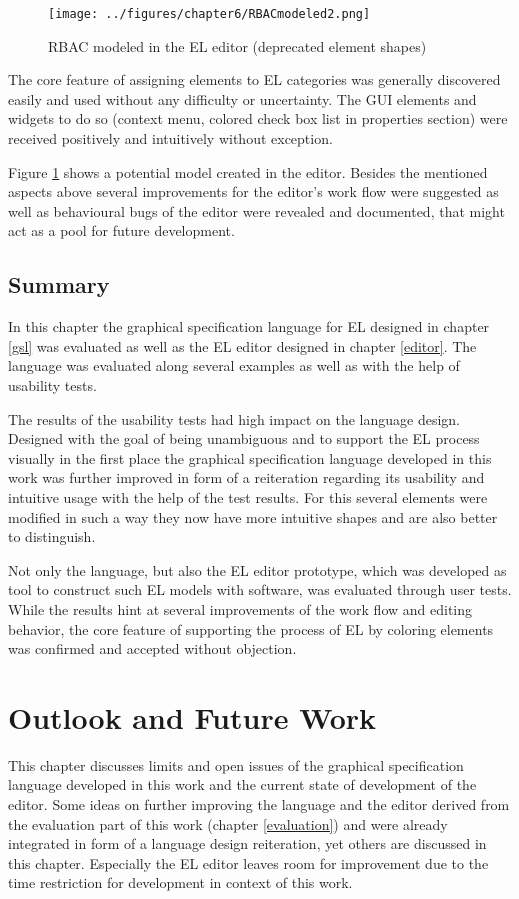 \documentclass[twoside, openright, 12pt]{book}
\begin{document}
\begin{figure}[bht]
	\centering
	\texttt{[image: ../figures/chapter6/RBACmodeled2.png]}
	\caption{RBAC modeled in the EL editor (deprecated element shapes)}
	\label{fig:RBACmodeled2}
\end{figure}

The core feature of assigning elements to EL categories was generally discovered easily and used without any difficulty or uncertainty.
The GUI elements and widgets to do so (context menu, colored check box list in properties section) were received positively and intuitively without exception.

Figure \ref{fig:RBACmodeled2} shows a potential model created in the editor.
Besides the mentioned aspects above several improvements for the editor's work flow were suggested as well as behavioural bugs of the editor were revealed and documented, that might act as a pool for future development.



\section{Summary}
\label{eval_summary}
In this chapter the graphical specification language for EL designed in chapter \ref{gsl} was evaluated as well as the EL editor designed in chapter \ref{editor}.
The language was evaluated along several examples as well as with the help of usability tests.

The results of the usability tests had high impact on the language design.
Designed with the goal of being unambiguous and to support the EL process visually in the first place the graphical specification language developed in this work was further improved in form of a reiteration regarding its usability and intuitive usage with the help of the test results.
For this several elements were modified in such a way they now have more intuitive shapes and are also better to distinguish.

Not only the language, but also the EL editor prototype, which was developed as tool to construct such EL models with software, was evaluated through user tests.
While the results hint at several improvements of the work flow and editing behavior, the core feature of supporting the process of EL by coloring elements was confirmed and accepted without objection.



\cleardoublepage
\chapter{Outlook and Future Work}
\label{future_work}
This chapter discusses limits and open issues of the graphical specification language developed in this work and the current state of development of the editor.
Some ideas on further improving the language and the editor derived from the evaluation part of this work (chapter \ref{evaluation}) and were already integrated in form of a language design reiteration, yet others are discussed in this chapter.
Especially the EL editor leaves room for improvement due to the time restriction for development in context of this work.
\end{document}
